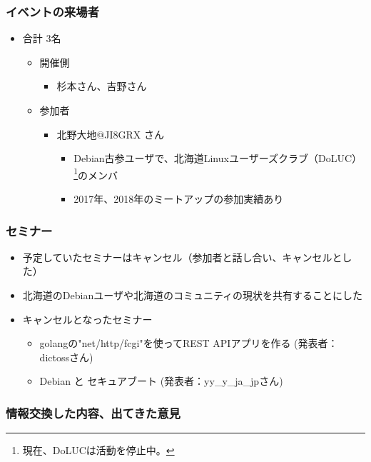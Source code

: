 \documentclass[mingoth,a4paper]{jsarticle}
\begin{document}
\subsubsection{イベントの来場者}

\begin{itemize}
\item 合計 3名
  \begin{itemize}
  \item 開催側
    \begin{itemize}
    \item 杉本さん、吉野さん
    \end{itemize}
  \item 参加者
    \begin{itemize}
    \item 北野大地@JI8GRX さん
      \begin{itemize}
      \item Debian古参ユーザで、北海道Linuxユーザーズクラブ（DoLUC）\footnote{現在、DoLUCは活動を停止中。}のメンバ
      \item 2017年、2018年のミートアップの参加実績あり
      \end{itemize}
    \end{itemize}
  \end{itemize}
\end{itemize}


\subsubsection{セミナー}

\begin{itemize}
\item 予定していたセミナーはキャンセル（参加者と話し合い、キャンセルとした）
\item 北海道のDebianユーザや北海道のコミュニティの現状を共有することにした
\item キャンセルとなったセミナー
  \begin{itemize}
  \item golangの"net/http/fcgi"を使ってREST APIアプリを作る (発表者：dictossさん)
  \item Debian と セキュアブート (発表者：yy\_y\_ja\_jpさん)
  \end{itemize}
\end{itemize}

  
\subsubsection{情報交換した内容、出てきた意見}
\end{document}
